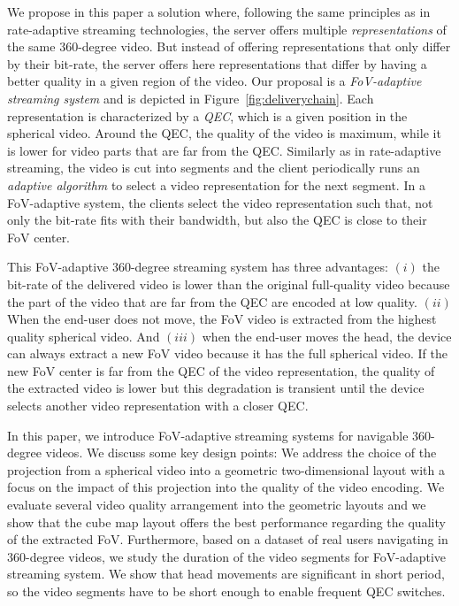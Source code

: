 We propose in this paper a solution where, following the same principles as in
rate-adaptive streaming technologies, the server offers multiple \emph{representations}
of the same 360-degree video. But instead of offering representations that only differ by
their bit-rate, the server offers here representations that differ by 
having a better quality in a given region of the video.
Our proposal is a \emph{FoV-adaptive streaming system} and is depicted in Figure~\ref{fig:deliverychain}.
Each representation is characterized by a \emph{\ac{QEC}}, which is a given
position in the spherical video. Around the \ac{QEC}, the quality of the video is maximum,
while it is lower for video parts that are far from the \ac{QEC}. Similarly as
in rate-adaptive streaming, the video is cut into segments and the client periodically runs 
an \emph{adaptive algorithm} to select
a video representation for the next segment. In a \ac{FoV}-adaptive system, the clients select
the video representation such that, not only the bit-rate fits with their bandwidth, but also
the \ac{QEC} is close to their \ac{FoV} center.



This \ac{FoV}-adaptive 360-degree streaming system has three advantages:
$(i)$ the bit-rate of the delivered video is lower than the original full-quality video because the 
part of the video that are far from the \ac{QEC} are encoded at low quality.
$(ii)$ When the end-user does not move, the \ac{FoV} video is extracted from the highest
quality spherical video.
And $(iii)$ when the end-user moves the head, the device can
always extract
a new \ac{FoV} video because it has the full spherical video. If the
new \ac{FoV} center is far from the
\ac{QEC} of the video representation, the quality of the extracted video is lower but this
degradation is transient until the
device selects another video representation with a closer \ac{QEC}.

In this paper, we introduce \ac{FoV}-adaptive streaming systems for navigable 360-degree
videos. We discuss some key design points: We address
the choice of the projection from a spherical video into a geometric two-dimensional layout
with a focus on the impact of this projection into the quality of the video encoding. We evaluate
several video quality arrangement into the geometric layouts and we show that the
cube map layout offers the best performance regarding the quality of the extracted
\ac{FoV}.
Furthermore, based on a dataset of
real users navigating in 360-degree videos, we study the duration of the video segments
for \ac{FoV}-adaptive streaming system. We show that head movements are significant
in short period, so the video segments have to be short enough to enable
frequent \ac{QEC} switches.

